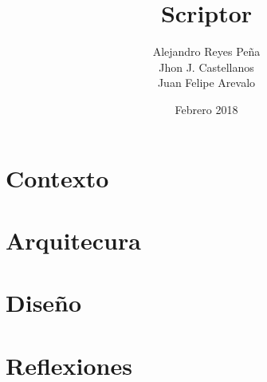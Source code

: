 \documentclass[a4paper,12pt]{book}
\begin{document}
\author{Alejandro Reyes Peña\\Jhon J. Castellanos\\Juan Felipe Arevalo}
\title{Scriptor}
\date{Febrero 2018}

\frontmatter
\maketitle
\tableofcontents

\mainmatter
\part{Contexto}



\part{Arquitecura}








\part{Diseño}











\part{Reflexiones}




\backmatter


\end{document}
